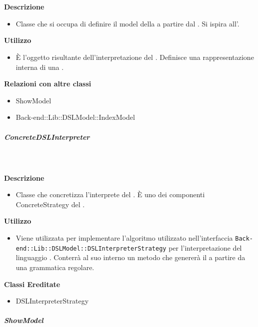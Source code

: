         \textbf{\\ \\ Descrizione} 
          \begin{itemize}
            \item[] Classe che si occupa di definire il model della  a partire dal . Si ispira all'.
          \end{itemize}      
        \textbf{Utilizzo}  
          \begin{itemize}
            \item[] È l'oggetto risultante dell'interpretazione del . Definisce una rappresentazione interna di una .
          \end{itemize}
          \textbf{Relazioni con altre classi}
          \begin{itemize}
              \item{ShowModel}
              \item{Back-end::Lib::DSLModel::IndexModel}
          \end{itemize}
      \subparagraph{ConcreteDSLInterpreter}
        
        \textbf{\\ \\ Descrizione} 
          \begin{itemize}
            \item[] Classe che concretizza l'interprete del . È uno dei componenti ConcreteStrategy del  .
          \end{itemize}      
        \textbf{Utilizzo}  
          \begin{itemize}
            \item[] Viene utilizzata per implementare l'algoritmo utilizzato nell'interfaccia \texttt{Back-end::Lib::DSLModel::DSLInterpreterStrategy} per l'interpretazione del linguaggio . Conterrà al suo interno un metodo che genererà il  a partire da una grammatica regolare.
          \end{itemize}
          \textbf{Classi Ereditate}
          \begin{itemize}
                \item{DSLInterpreterStrategy}
          \end{itemize}
      \subparagraph{ShowModel}
        
